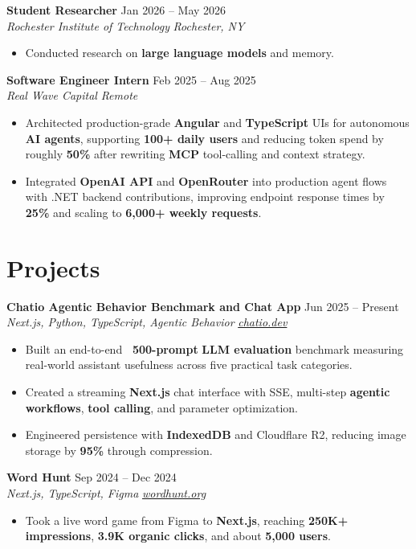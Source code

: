 \documentclass[10pt,letterpaper]{article}
\newif\ifresumeFirstRole
\newcommand{\resumeRole}[4]{%
  \ifresumeFirstRole
    \global\resumeFirstRolefalse
  \else
    \vspace{0pt plus 1fill}%
  \fi
  \textbf{#1} \hfill #2\\
  \textit{#3} \hfill \textit{#4}
}
\begin{document}
\resumeRole{Student Researcher}{Jan 2026 -- May 2026}{Rochester Institute of Technology}{Rochester, NY}
\begin{itemize}
  \item Conducted research on \textbf{large language models} and memory.
\end{itemize}

\resumeRole{Software Engineer Intern}{Feb 2025 -- Aug 2025}{Real Wave Capital}{Remote}
\begin{itemize}
  \item Architected production-grade \textbf{Angular} and \textbf{TypeScript} UIs for autonomous \textbf{AI agents}, supporting \textbf{100+ daily users} and reducing token spend by roughly \textbf{50\%} after rewriting \textbf{MCP} tool-calling and context strategy.
  \item Integrated \textbf{OpenAI API} and \textbf{OpenRouter} into production agent flows with .NET backend contributions, improving endpoint response times by \textbf{25\%} and scaling to \textbf{6,000+ weekly requests}.
\end{itemize}

\section*{Projects}

\resumeRole{Chatio Agentic Behavior Benchmark and Chat App}{Jun 2025 -- Present}{Next.js, Python, TypeScript, Agentic Behavior}{\href{https://chatio.dev}{chatio.dev}}
\begin{itemize}
  \item Built an end-to-end \textbf{~500-prompt} \textbf{LLM evaluation} benchmark measuring real-world assistant usefulness across five practical task categories.
  \item Created a streaming \textbf{Next.js} chat interface with SSE, multi-step \textbf{agentic workflows}, \textbf{tool calling}, and parameter optimization.
  \item Engineered persistence with \textbf{IndexedDB} and Cloudflare R2, reducing image storage by \textbf{95\%} through compression.
\end{itemize}

\resumeRole{Word Hunt}{Sep 2024 -- Dec 2024}{Next.js, TypeScript, Figma}{\href{https://wordhunt.org}{wordhunt.org}}
\begin{itemize}
  \item Took a live word game from Figma to \textbf{Next.js}, reaching \textbf{250K+ impressions}, \textbf{3.9K organic clicks}, and about \textbf{5,000 users}.
\end{itemize}
\end{document}

